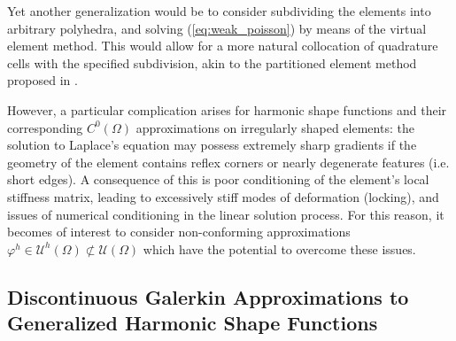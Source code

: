 	Yet another generalization would be to consider subdividing the elements into arbitrary polyhedra, and solving (\ref{eq:weak_poisson}) by means of the virtual element method. This would allow for a more natural collocation of quadrature cells with the specified subdivision, akin to the partitioned element method proposed in \cite{Rashid:12}.
	
	However, a particular complication arises for harmonic shape functions and their corresponding $C^0 (\Omega)$ approximations on irregularly shaped elements: the solution to Laplace's equation may possess extremely sharp gradients if the geometry of the element contains reflex corners or nearly degenerate features (i.e. short edges). A consequence of this is poor conditioning of the element's local stiffness matrix, leading to excessively stiff modes of deformation (locking), and issues of numerical conditioning in the linear solution process. For this reason, it becomes of interest to consider non-conforming approximations $\varphi^h \in \mathcal{U}^h (\Omega) \not\subset \mathcal{U} (\Omega)$ which have the potential to overcome these issues.	

\subsection*{Discontinuous Galerkin Approximations to \\ Generalized Harmonic Shape Functions}

